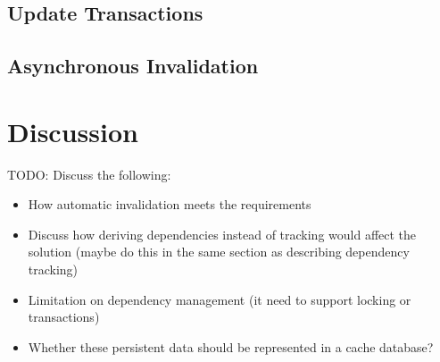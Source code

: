 \subsection{Update Transactions}
\label{subsec:update-transactions}






\subsection{Asynchronous Invalidation}
\label{subsec:asynchronous-invalidation}





\section{Discussion}
\label{sec:invalidation-discussion}

TODO: Discuss the following:

\begin{itemize}
  \item How automatic invalidation meets the requirements
  \item Discuss how deriving dependencies instead of tracking would affect the solution (maybe do this in the same section as describing dependency tracking)
  \item Limitation on dependency management (it need to support locking or transactions)
  \item Whether these persistent data should be represented in a cache database?
\end{itemize}

